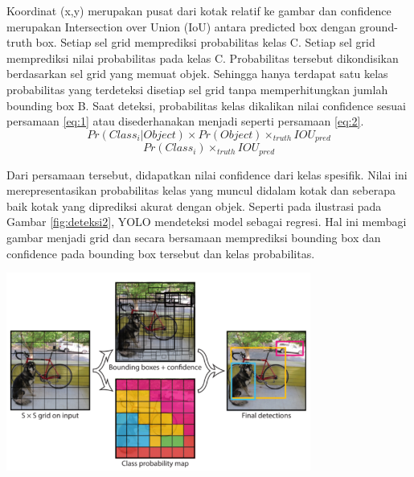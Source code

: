 Koordinat (x,y) merupakan pusat dari kotak relatif ke gambar dan
confidence merupakan Intersection over Union (IoU) antara predicted box dengan ground-truth box. Setiap sel grid memprediksi
probabilitas kelas C. Setiap sel grid memprediksi nilai probabilitas
pada kelas C. Probabilitas tersebut dikondisikan berdasarkan sel
grid yang memuat objek. Sehingga hanya terdapat satu kelas probabilitas yang terdeteksi disetiap sel grid tanpa memperhitungkan
jumlah bounding box B. Saat deteksi, probabilitas kelas dikalikan
nilai confidence sesuai persamaan \ref{eq:1} atau disederhanakan menjadi seperti persamaan \ref{eq:2}.\citep{Redmon_2016_CVPR}
\begin{equation}\label{eq:1}
	Pr(Class_i|Object) \times Pr(Object) \times_{truth} IOU_{pred}
\end{equation}
\begin{equation}\label{eq:2}
	Pr(Class_i) \times_{truth} IOU_{pred}
\end{equation}

Dari persamaan tersebut, didapatkan nilai confidence dari kelas spesifik. Nilai ini merepresentasikan probabilitas kelas yang muncul didalam kotak dan seberapa baik kotak yang diprediksi akurat dengan
objek. Seperti pada ilustrasi pada Gambar \ref{fig:deteksi2}, YOLO mendeteksi
model sebagai regresi. Hal ini membagi gambar menjadi grid dan
secara bersamaan memprediksi bounding box dan confidence pada
bounding box tersebut dan kelas probabilitas.\citep{Redmon_2016_CVPR}

\begin{center}
	\includegraphics[width=0.75\textwidth]{gambar/deteksi2.png}
	\citep{Redmon_2016_CVPR}
	\label{fig:deteksi2}
\end{center}


